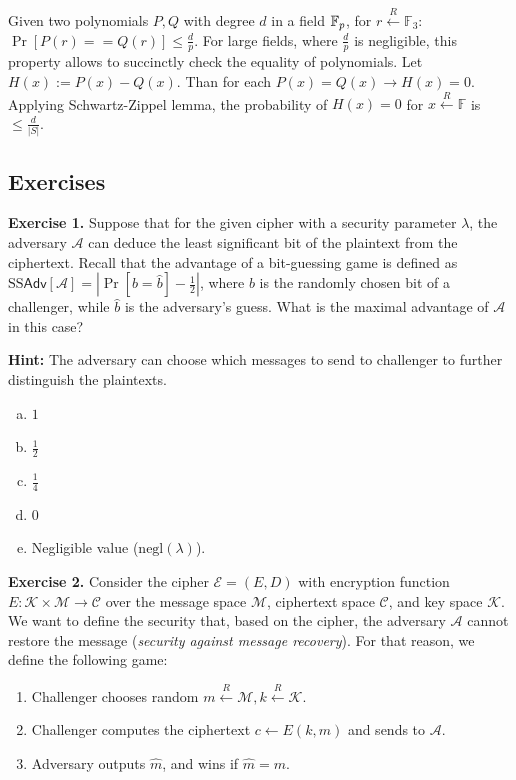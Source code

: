 \documentclass[../lecture-notes.tex]{subfiles}
\begin{document}
Given two polynomials $P, Q$ with  degree $d$ in a field $\mathbb{F}_p$, for $r \xleftarrow{R} \mathbb{F}_3$: $\Pr[P(r) == Q(r)] \le \frac{d}{p}$.
For large fields, where  $\frac{d}{p}$ is negligible, this property allows to succinctly check the equality of polynomials.
Let $H(x) := P(x) - Q(x)$. Than for each $P(x) = Q(x) \rightarrow H(x) = 0$. Applying Schwartz-Zippel lemma, 
the probability of $H(x) = 0$ for $x \xleftarrow{R} \mathbb{F} $ is $\le \frac{d}{|S|}$.

\subsection{Exercises}

\textbf{Exercise 1.} Suppose that for the given cipher with a security parameter $\lambda$, the adversary $\mathcal{A}$ can deduce the least significant bit of the plaintext from the ciphertext. Recall that the advantage 
of a bit-guessing game is defined as $\text{SS}\mathsf{Adv}[\mathcal{A}] = \left|\Pr[b=\hat{b}] - \frac{1}{2}\right|$, where $b$ is the randomly chosen bit of a challenger, while 
$\hat{b}$ is the adversary's guess. What is the maximal advantage of $\mathcal{A}$ in this case?

\textbf{Hint:} The adversary can choose which messages to send to challenger to further distinguish the plaintexts.

\begin{enumerate}[a)]
    \item $1$
    \item $\frac{1}{2}$
    \item $\frac{1}{4}$
    \item $0$
    \item Negligible value ($\text{negl}(\lambda)$).
\end{enumerate}

\textbf{Exercise 2.} Consider the cipher $\mathcal{E} = (E,D)$ with encryption function $E: \mathcal{K} \times \mathcal{M} \to \mathcal{C}$ over the message space $\mathcal{M}$, ciphertext space $\mathcal{C}$, and key space $\mathcal{K}$. We want to define the security
that, based on the cipher, the adversary $\mathcal{A}$ cannot restore the message (\textit{security against message recovery}). For that reason, we define the following game:
\begin{enumerate}
    \item Challenger chooses random $m \xleftarrow{R} \mathcal{M}, k \xleftarrow{R} \mathcal{K}$.
    \item Challenger computes the ciphertext $c \gets E(k,m)$ and sends to $\mathcal{A}$.
    \item Adversary outputs $\hat{m}$, and wins if $\hat{m} = m$.
\end{enumerate}
\end{document}
